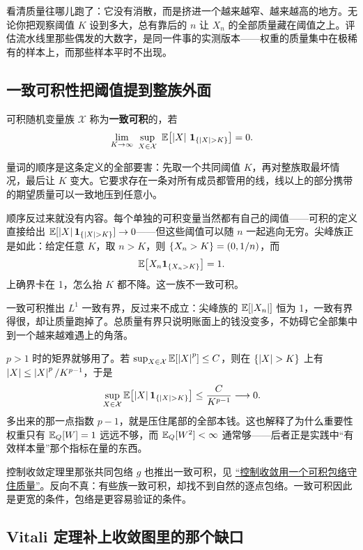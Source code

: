 看清质量往哪儿跑了：它没有消散，而是挤进一个越来越窄、越来越高的地方。无论你把观察阈值 \(K\) 设到多大，总有靠后的 \(n\) 让 \(X_n\) 的全部质量藏在阈值之上。评估流水线里那些偶发的大数字，是同一件事的实测版本——权重的质量集中在极稀有的样本上，而那些样本平时不出现。

\subsection{一致可积性把阈值提到整族外面}

\begin{definition}
可积随机变量族 \(\mathcal X\) 称为\textbf{一致可积}的，若
\[
\lim_{K\to\infty}\ \sup_{X\in\mathcal X}\ \E\bigl[\abs{X}\,\ind_{\set{\abs{X}>K}}\bigr]=0.
\]
\end{definition}

量词的顺序是这条定义的全部要害：先取一个共同阈值 \(K\)，再对整族取最坏情况，最后让 \(K\) 变大。它要求存在一条对所有成员都管用的线，线以上的部分携带的期望质量可以一致地压到任意小。

顺序反过来就没有内容。每个单独的可积变量当然都有自己的阈值——可积的定义直接给出 \(\E[\abs X\ind_{\set{\abs X>K}}]\to 0\)——但这些阈值可以随 \(n\) 一起逃向无穷。尖峰族正是如此：给定任意 \(K\)，取 \(n>K\)，则 \(\left\{X_n>K\right\}=(0,1/n)\)，而
\[
\mathbb{E}\bigl[X_n\mathbf{1}_{\left\{X_n>K\right\}}\bigr]=1.
\]
上确界卡在 1，怎么抬 \(K\) 都不降。这一族不一致可积。

一致可积推出 \(L^1\) 一致有界，反过来不成立：尖峰族的 \(\mathbb{E}[\left|X_n\right|]\) 恒为 1，一致有界得很，却让质量跑掉了。总质量有界只说明账面上的钱没变多，不妨碍它全部集中到一个越来越难遇上的角落。

\(p>1\) 时的矩界就够用了。若 \(\sup_{X\in\mathcal X}\mathbb{E}[\left|X\right|^{p}]\le C\)，则在 \(\set{\abs X>K}\) 上有 \(\left|X\right|\le \left|X\right|^{p}/K^{p-1}\)，于是
\[
\sup_{X\in\mathcal X}\E\bigl[\abs X\ind_{\set{\abs X>K}}\bigr]\le\frac{C}{K^{p-1}}\longrightarrow 0.
\]
多出来的那一点指数 \(p-1\)，就是压住尾部的全部本钱。这也解释了为什么重要性权重只有 \(\mathbb{E}_Q[W]=1\) 远远不够，而 \(\mathbb{E}_Q[W^{2}]<\infty\) 通常够——后者正是实践中``有效样本量''那个指标在量的东西。

控制收敛定理里那张共同包络 \(g\) 也推出一致可积，见 \hyperref[sec:12-Real-Analysis-Support/04-Limits-and-Integration/02]{``控制收敛用一个可积包络守住质量''}。反向不真：有些族一致可积，却找不到自然的逐点包络。一致可积因此是更宽的条件，包络是更容易验证的条件。

\subsection{Vitali 定理补上收敛图里的那个缺口}

